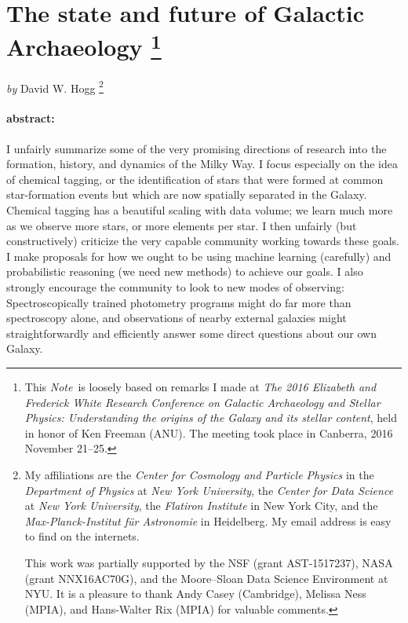 \documentclass[11pt, letterpaper]{article}
\newcommand{\documentname}{\textsl{Note}}
\begin{document}
\section*{The state and future of Galactic Archaeology%
\footnote{This \documentname\ is loosely based on remarks I made at
  \textsl{The 2016 Elizabeth and Frederick White Research Conference on
    Galactic Archaeology and Stellar Physics: Understanding the
    origins of the Galaxy and its stellar content}, held in honor of
  Ken Freeman (ANU). The meeting took place in Canberra, 2016 November 21--25.\label{foot:conference}}}

\noindent
\textit{by} {David W. Hogg}%
\footnote{My affiliations are the \textsl{Center for Cosmology and
    Particle Physics} in the \textsl{Department of Physics} at \textsl{New York University}, the
  \textsl{Center for Data Science} at \textsl{New York University}, the
  \textsl{Flatiron Institute} in New York City, and the
  \textsl{Max-Planck-Institut f\"ur Astronomie} in Heidelberg. My email address
  is easy to find on the internets.
  
  This work
  was partially supported by the NSF (grant AST-1517237), NASA (grant
  NNX16AC70G), and the Moore--Sloan Data Science Environment at
  NYU. It is a pleasure to thank Andy Casey (Cambridge), Melissa Ness
  (MPIA), and Hans-Walter Rix (MPIA) for valuable comments.}

\paragraph{abstract:}
I unfairly summarize some of the very promising directions of research
into the formation, history, and dynamics of the Milky Way. I focus
especially on the idea of chemical tagging, or the identification of
stars that were formed at common star-formation events but which are
now spatially separated in the Galaxy. Chemical tagging has a
beautiful scaling with data volume; we learn much more as we observe
more stars, or more elements per star.
I then unfairly (but constructively) criticize the very
capable community working towards these goals. I make proposals for
how we ought to be using machine learning (carefully) and
probabilistic reasoning (we need new methods) to achieve our goals.  I
also strongly encourage the community to look to new modes of
observing: Spectroscopically trained photometry programs might do far
more than spectroscopy alone, and observations of nearby external
galaxies might straightforwardly and efficiently answer some direct
questions about our own Galaxy.
\end{document}
